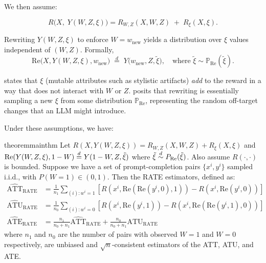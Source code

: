 We then assume:

\begin{assumption}
\label{assump:additive}
\[
R\bigl(X,\;Y(W,Z,\xi)\bigr) = R_{W,Z}(X,W,Z) \;+\; R_{\xi}(X,\xi).
\]
\end{assumption}

\begin{assumption}
\label{assump:rewrite_dist}
Rewriting $Y(W,Z,\xi)$ to enforce $W=w_{\text{new}}$ yields a distribution over $\xi$ values independent of $(W,Z)$. Formally,
\[
\text{Re}\bigl(X, Y(W,Z,\xi), w_{\text{new}} \bigr) \;\stackrel{d}{=}\; Y\bigl(w_{\text{new}},Z,\widetilde{\xi}\bigr),
\quad\text{where } \widetilde{\xi} \sim \mathbb{P}_{\mathrm{Re}}(\widetilde{\xi}).
\]
\end{assumption}
\noindent
{} states that $\xi$ (mutable attributes such as stylistic artifacts) \emph{add} to the reward in a way that does not interact with $W$ or $Z$.  posits that rewriting is essentially sampling a new $\xi$ from some distribution $\mathbb{P}_{\mathrm{Re}}$, representing the random off-target changes that an LLM might introduce.

Under these assumptions, we have:

\begin{restatable}{theorem}{mainthm}
\label{thm:mainthm}
Let $R(X, Y(W,Z,\xi)) = R_{W, Z}(X, W, Z) + R_{\xi}(X, \xi)$ and $\text{Re}(Y(W, Z, \xi), 1 - W) \stackrel{d}{=} Y(1 - W, Z, \tilde{\xi})$ where $\tilde{\xi} \stackrel{d}{\sim} P_\text{Re}(\tilde{\xi})$. Also assume $R(\cdot, \cdot)$ is bounded. Suppose we have a set of prompt-completion pairs $\{x^i, y^{i}\}$ sampled i.i.d., with $P(W=1) \in (0, 1)$.
  Then the RATE estimators, defined as:
  \begin{align*}
  \widehat{\text{ATT}}_{\text{RATE}} &= \frac{1}{n_1} \sum_{(i): w^{i} = 1} [R(x^i, \text{Re}(\text{Re}(y^{i}, 0), 1)) - R(x^i, \text{Re}(y^{i}, 0))] \\
  \widehat{\text{ATU}}_{\text{RATE}} &= \frac{1}{n_0} \sum_{(i): w^{i} = 0} [R(x^i, \text{Re}(y^{i}, 1)) - R(x^i, \text{Re}(\text{Re}(y^{i}, 1), 0))] \\
  \widehat{\text{ATE}}_{\text{RATE}} &= \frac{n_1}{n_0 + n_1} \widehat{\text{ATT}}_{\text{RATE}} + \frac{n_0}{n_0 + n_1} \widehat{\text{ATU}}_{\text{RATE}}
\end{align*}
where $n_1$ and $n_0$ are the number of pairs with observed $W = 1$ and $W = 0$ respectively, are unbiased and $\sqrt{n}$-consistent estimators of the ATT, ATU, and ATE.
\end{restatable}

